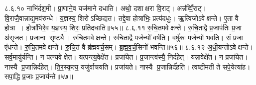 ८.६.१०
नाभि॑र्दश॒मी। प्रा॒णाने॒व यज॑माने दधाति। अथो॒ दशाक्षरा वि॒राट्। अन्न॑व्विँ॒राट्। वि॒राजै॒वान्नाद्य॒मव॑रुन्धे। य॒ज्ञस्य॒ शिरोऽच्छिद्यत। तद्दे॒वा होत्रा॑भिः॒ प्रत्य॑दधुः। ऋ॒त्विजोऽवेक्षन्ते। ए॒ता वै होत्रा। होत्रा॑भिरे॒व य॒ज्ञस्य॒ शिरः॒ प्रति॑दधाति॥५५॥
८.६.११
रु॒चि॒तमवेक्षन्ते। रु॒चि॒ताद्वै प्र॒जाप॑तिः प्र॒जा अ॑सृजत। प्र॒जाना॒ सृष्ट्यै। रु॒चि॒तमवेक्षन्ते। रु॒चि॒ताद्वै प॒र्जन्यो॑ वर्\mbox{}षति। वर्\mbox{}षु॑कः प॒र्जन्यो॑ भवति। सं प्र॒जा ए॑धन्ते। रु॒चि॒तमवेक्षन्ते। रु॒चि॒तं वै ब्र॑ह्मवर्च॒सम्। ब्र॒ह्म॒व॒र्च॒सिनो॑ भवन्ति॥५६॥
८.६.१२
अ॒धी॒यन्तोऽवेक्षन्ते। सर्व॒मायु॑र्यन्ति। न पत्न्यवेक्षेत। यत्पन्त्य॒वेक्षे॑त। प्रजा॑येत। प्र॒जान्त्व॑स्यै॒ निर्द॑हेत्। यन्नावेक्षे॑त। न प्रजा॑येत। नास्यै प्र॒जान्निर्द॑हेत्। ति॒र॒स्कृत्य॒ यजु॑र्वाचयति। प्रजा॑यते। नास्यै प्र॒जान्निर्द॑हति। त्वष्टी॑मती ते सपे॒येत्या॑ह। सपा॒द्धि प्र॒जाः प्र॒जाय॑न्ते॥५७॥
\anuvakamend

